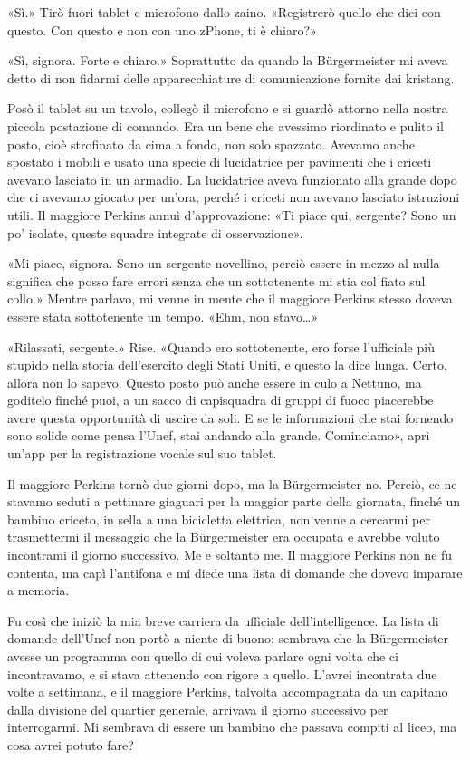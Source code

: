 «Sì.» Tirò fuori tablet e microfono dallo zaino. «Registrerò quello che
dici con questo. Con questo e non con uno zPhone, ti è chiaro?»

«Sì, signora. Forte e chiaro.» Soprattutto da quando la Bürgermeister mi
aveva detto di non fidarmi delle apparecchiature di comunicazione
fornite dai kristang.

Posò il tablet su un tavolo, collegò il microfono e si guardò attorno
nella nostra piccola postazione di comando. Era un bene che avessimo
riordinato e pulito il posto, cioè strofinato da cima a fondo, non solo
spazzato. Avevamo anche spostato i mobili e usato una specie di
lucidatrice per pavimenti che i criceti avevano lasciato in un armadio.
La lucidatrice aveva funzionato alla grande dopo che ci avevamo giocato
per un'ora, perché i criceti non avevano lasciato istruzioni utili. Il
maggiore Perkins annuì d'approvazione: «Ti piace qui, sergente? Sono un
po' isolate, queste squadre integrate di osservazione».

«Mi piace, signora. Sono un sergente novellino, perciò essere in mezzo
al nulla significa che posso fare errori senza che un sottotenente mi
stia col fiato sul collo.» Mentre parlavo, mi venne in mente che il
maggiore Perkins stesso doveva essere stata sottotenente un tempo. «Ehm,
non stavo\ldots»

«Rilassati, sergente.» Rise. «Quando ero sottotenente, ero forse
l'ufficiale più stupido nella storia dell'esercito degli Stati Uniti, e
questo la dice lunga. Certo, allora non lo sapevo. Questo posto può
anche essere in culo a Nettuno, ma goditelo finché puoi, a un sacco di
capisquadra di gruppi di fuoco piacerebbe avere questa opportunità di
uscire da soli. E se le informazioni che stai fornendo sono solide come
pensa l'Unef, stai andando alla grande. Cominciamo», aprì un'app per la
registrazione vocale sul suo tablet.

\hfill\break

Il maggiore Perkins tornò due giorni dopo, ma la Bürgermeister no.
Perciò, ce ne stavamo seduti a pettinare giaguari per la maggior parte
della giornata, finché un bambino criceto, in sella a una bicicletta
elettrica, non venne a cercarmi per trasmettermi il messaggio che la
Bürgermeister era occupata e avrebbe voluto incontrami il giorno
successivo. Me e soltanto me. Il maggiore Perkins non ne fu contenta, ma
capì l'antifona e mi diede una lista di domande che dovevo imparare a
memoria.

Fu così che iniziò la mia breve carriera da ufficiale dell'intelligence.
La lista di domande dell'Unef non portò a niente di buono; sembrava che
la Bürgermeister avesse un programma con quello di cui voleva parlare
ogni volta che ci incontravamo, e si stava attenendo con rigore a
quello. L'avrei incontrata due volte a settimana, e il maggiore Perkins,
talvolta accompagnata da un capitano dalla divisione del quartier
generale, arrivava il giorno successivo per interrogarmi. Mi sembrava di
essere un bambino che passava compiti al liceo, ma cosa avrei potuto
fare?

